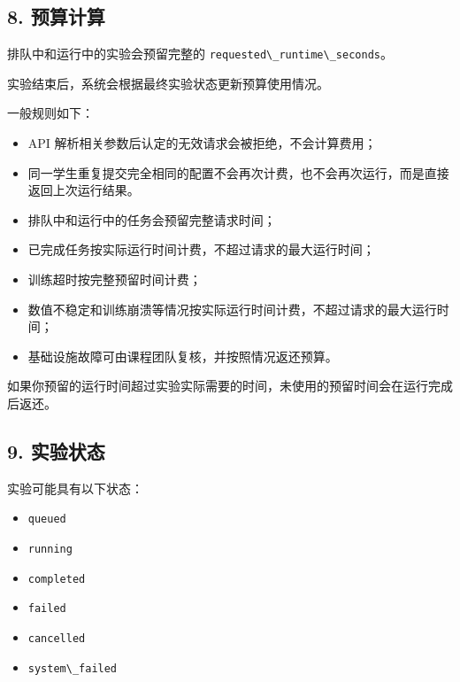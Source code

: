 \documentclass[
  11pt,
]{ctexart}
\newcommand{\passthrough}[1]{#1}
\providecommand{\tightlist}{%
  \setlength{\itemsep}{0pt}\setlength{\parskip}{0pt}}
\begin{document}
\hypertarget{ux9884ux7b97ux8ba1ux7b97}{%
\subsection{8. 预算计算}\label{ux9884ux7b97ux8ba1ux7b97}}

排队中和运行中的实验会预留完整的
\passthrough{\lstinline!requested\_runtime\_seconds!}。

实验结束后，系统会根据最终实验状态更新预算使用情况。

一般规则如下：

\begin{itemize}
\tightlist
\item
  API 解析相关参数后认定的无效请求会被拒绝，不会计算费用；
\item
  同一学生重复提交完全相同的配置不会再次计费，也不会再次运行，而是直接返回上次运行结果。
\item
  排队中和运行中的任务会预留完整请求时间；
\item
  已完成任务按实际运行时间计费，不超过请求的最大运行时间；
\item
  训练超时按完整预留时间计费；
\item
  数值不稳定和训练崩溃等情况按实际运行时间计费，不超过请求的最大运行时间；
\item
  基础设施故障可由课程团队复核，并按照情况返还预算。
\end{itemize}

如果你预留的运行时间超过实验实际需要的时间，未使用的预留时间会在运行完成后返还。

\hypertarget{ux5b9eux9a8cux72b6ux6001}{%
\subsection{9. 实验状态}\label{ux5b9eux9a8cux72b6ux6001}}

实验可能具有以下状态：

\begin{itemize}
\tightlist
\item
  \passthrough{\lstinline!queued!}
\item
  \passthrough{\lstinline!running!}
\item
  \passthrough{\lstinline!completed!}
\item
  \passthrough{\lstinline!failed!}
\item
  \passthrough{\lstinline!cancelled!}
\item
  \passthrough{\lstinline!system\_failed!}
\end{itemize}
\end{document}

